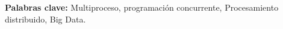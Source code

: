 \textbf{Palabras clave:} Multiproceso, programación concurrente,
  Procesamiento distribuido, Big Data.
